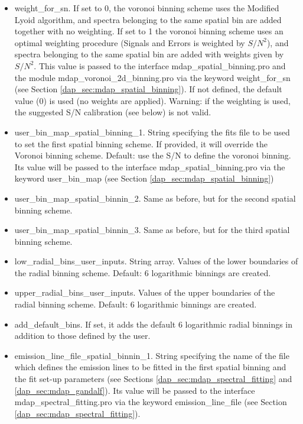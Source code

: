 \begin{itemize}
 \item weight\_for\_sn. If set to 0, the voronoi binning scheme uses
   the Modified Lyoid algorithm, and spectra belonging to the same
   spatial bin are added together with no weighting. If set to 1 the
   voronoi binning scheme uses an optimal weighting procedure (Signals
   and Errors is weighted by $S/N^2$), and spectra belonging to the
   same spatial bin are added with weights given by $S/N^2$. This
   value is passed to the interface mdap\_spatial\_binning.pro and the
   module mdap\_voronoi\_2d\_binning.pro via the keyword
   weight\_for\_sn (see Section
   \ref{dap_sec:mdap_spatial_binning}). If not defined, the default
   value (0) is used (no weights are applied). Warning: if the
   weighting is used, the suggested S/N calibration (see below) is not
   valid.

 \item user\_bin\_map\_spatial\_binning\_1. String specifying the fits
   file to be used to set the first spatial binning scheme. If
   provided, it will override the Voronoi binning scheme. Default: use
   the S/N to define the voronoi binning. Its value will be passed to
   the interface mdap\_spatial\_binning.pro via the keyword
   user\_bin\_map (see Section \ref{dap_sec:mdap_spatial_binning})

 \item user\_bin\_map\_spatial\_binnin\_2. Same as before, but for the
   second spatial binning scheme.

 \item user\_bin\_map\_spatial\_binnin\_3. Same as before, but for the
   third spatial binning scheme.

\item low\_radial\_bins\_user\_inputs. String array. Values of the
  lower boundaries of the radial binning scheme. Default: 6
  logarithmic binnings are created.

 \item upper\_radial\_bins\_user\_inputs. Values of the
  upper boundaries of the radial binning scheme. Default: 6
  logarithmic binnings are created.

 \item add\_default\_bins. If set, it adds the default 6 logarithmic
  radial binnings in addition to those defined by the user.

 \item emission\_line\_file\_spatial\_binnin\_1. String specifying the
   name of the file which defines the emission lines to be fitted in
   the first spatial binning and the fit set-up parameters (see
   Sections \ref{dap_sec:mdap_spectral_fitting} and
   \ref{dap_sec:mdap_gandalf}). Its value will be passed to the
   interface mdap\_spectral\_fitting.pro via the keyword
   emission\_line\_file (see Section
   \ref{dap_sec:mdap_spectral_fitting}).


\end{itemize}
